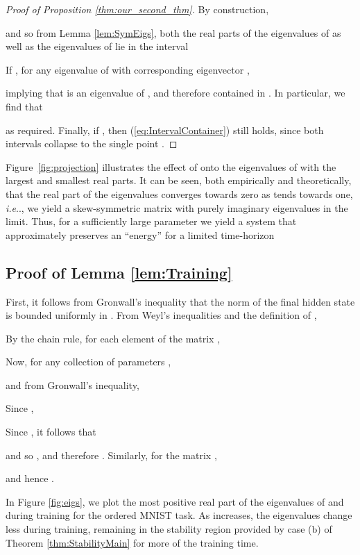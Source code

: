 \documentclass{article} \usepackage{iclr2021_conference,times}
\makeatletter
\DeclareRobustCommand\onedot{\futurelet\@let@token\@onedot}
\def\@onedot{\ifx\@let@token.\else.\null\fi\xspace}
\def\ie{\emph{i.e}\onedot} \def\Ie{\emph{I.e}\onedot}
\makeatother
\begin{document}
\begin{proof}[Proof of Proposition \ref{thm:our_second_thm}]
By construction,

and so from Lemma \ref{lem:SymEigs}, both the real parts  of the eigenvalues of  as well as the eigenvalues of  lie in the interval

If , for any eigenvalue  of  with corresponding eigenvector ,

implying that  is an eigenvalue of , and therefore contained in . 
In particular, we find that

as required. Finally, if , then (\ref{eq:IntervalContainer}) still holds, since both intervals collapse to the single point . 
\end{proof}


Figure~\ref{fig:projection} illustrates the effect of  onto the eigenvalues of  with the largest and smallest real parts. 
It can  be seen, both empirically and theoretically, that the real part of the eigenvalues converges towards zero as  tends towards one, \ie, we yield a skew-symmetric matrix with purely imaginary eigenvalues in the limit.
Thus, for a sufficiently large parameter  we yield a system that approximately preserves an ``energy'' for a limited time-horizon 



\subsection{Proof of Lemma \ref{lem:Training}}
First, it follows from Gronwall's inequality that the norm of the final hidden state  is bounded uniformly in . From Weyl's inequalities and the definition of ,

By the chain rule, for each element  of the matrix ,

Now, for any collection of parameters ,

and from Gronwall's inequality,

Since ,

Since , it follows that

and so , and therefore . Similarly, for the matrix ,

and hence . \qedsymbol

In Figure \ref{fig:eigs}, we plot the most positive real part of the eigenvalues of  and  during training for the ordered MNIST task. As  increases, the eigenvalues change less during training, remaining in the stability region provided by case (b) of Theorem \ref{thm:StabilityMain} for more of the training time.
\end{document}
